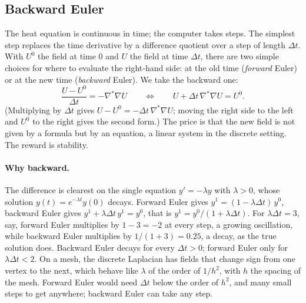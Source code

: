 \subsection{Backward Euler}

The heat equation is continuous in time; the computer takes steps. The simplest step replaces the time derivative by a difference quotient over a step of length $\Delta t$. With $U^0$ the field at time $0$ and $U$ the field at time $\Delta t$, there are two simple choices for where to evaluate the right-hand side: at the old time (\emph{forward} Euler) or at the new time (\emph{backward} Euler). We take the backward one:
\begin{equation}
\label{eqn:backward_euler}
\frac{U - U^0}{\Delta t} = -\nabla^* \nabla U \qquad \Longleftrightarrow \qquad U + \Delta t\, \nabla^* \nabla U = U^0 .
\end{equation}
(Multiplying by $\Delta t$ gives $U - U^0 = -\Delta t\, \nabla^*\nabla U$; moving the right side to the left and $U^0$ to the right gives the second form.) The price is that the new field is not given by a formula but by an equation, a linear system in the discrete setting. The reward is stability.

\paragraph{Why backward.} The difference is clearest on the single equation $y' = -\lambda y$ with $\lambda > 0$, whose solution $y(t) = e^{-\lambda t} y(0)$ decays. Forward Euler gives $y^1 = (1 - \lambda\Delta t)\, y^0$, backward Euler gives $y^1 + \lambda\Delta t\, y^1 = y^0$, that is $y^1 = y^0/(1 + \lambda\Delta t)$. For $\lambda\Delta t = 3$, say, forward Euler multiplies by $1 - 3 = -2$ at every step, a growing oscillation, while backward Euler multiplies by $1/(1+3) = 0.25$, a decay, as the true solution does. Backward Euler decays for every $\Delta t > 0$; forward Euler only for $\lambda\Delta t < 2$. On a mesh, the discrete Laplacian has fields that change sign from one vertex to the next, which behave like $\lambda$ of the order of $1/h^2$, with $h$ the spacing of the mesh. Forward Euler would need $\Delta t$ below the order of $h^2$, and many small steps to get anywhere; backward Euler can take any step.

